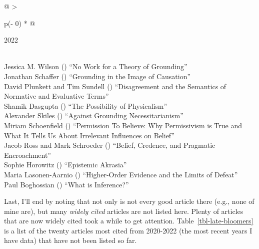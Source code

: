 \documentclass[
  10pt,
  letterpaper,
  DIV=11,
  numbers=noendperiod,
  twoside]{scrartcl}
\begin{document}
\begin{longtable}[]{@{}
  >{\raggedright\arraybackslash}p{(\columnwidth - 0\tabcolsep) * }@{}}

\caption{\label{tbl-top-ten-2013}Most cited articles published less than
ten years ago as of 2022.}

\tabularnewline

\toprule\noalign{}
\begin{minipage}[b]{\linewidth}\raggedright
2022
\end{minipage} \\
\midrule\noalign{}
\endhead
\bottomrule\noalign{}
\endlastfoot
Jessica M. Wilson
()
``No Work for a Theory of Grounding'' \\
Jonathan Schaffer
()
``Grounding in the Image of Causation'' \\
David Plunkett and Tim Sundell
()
``Disagreement and the Semantics of Normative and Evaluative Terms'' \\
Shamik Dasgupta
()
``The Possibility of Physicalism'' \\
Alexander Skiles
()
``Against Grounding Necessitarianism'' \\
Miriam Schoenfield
()
``Permission To Believe: Why Permissivism is True and What It Tells Us
About Irrelevant Influences on Belief'' \\
Jacob Ross and Mark Schroeder
()
``Belief, Credence, and Pragmatic Encroachment'' \\
Sophie Horowitz
()
``Epistemic Akrasia'' \\
Maria Lasonen-Aarnio
()
``Higher-Order Evidence and the Limits of Defeat'' \\
Paul Boghossian
()
``What is Inference?'' \\

\end{longtable}

Last, I'll end by noting that not only is not every good article there
(e.g., none of mine are), but many \emph{widely cited} articles are not
listed here. Plenty of articles that are now widely cited took a while
to get attention. Table~\ref{tbl-late-bloomers} is a list of the twenty
articles most cited from 2020-2022 (the most recent years I have data)
that have not been listed so far.
\end{document}
